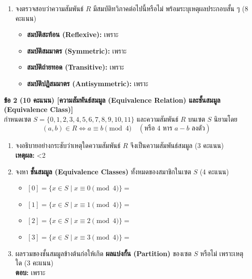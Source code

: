 \documentclass[a4paper,12pt]{article}
\newcounter{examline}
\newcommand{\examlines}[1]{%
  \setcounter{examline}{0}%
  \loop\ifnum\value{examline}<#1\relax
    \par\vspace{0.68em}\noindent\textcolor{gray!40}{\hrulefill}%
    \stepcounter{examline}%
  \repeat
}
\begin{document}
\begin{enumerate}[label=1.\arabic*), itemsep=3pt]
  \item จงตรวจสอบว่าความสัมพันธ์ $R$ มีสมบัติทวิภาคต่อไปนี้หรือไม่ พร้อมระบุเหตุผลประกอบสั้น ๆ (8 คะแนน)
  \begin{itemize}[leftmargin=1.0cm, itemsep=2.5pt]
    \item[ก)] \textbf{สมบัติสะท้อน (Reflexive):} \makebox[2.2cm]{\dotfill} เพราะ \makebox[8.2cm]{\dotfill}
    \item[ข)] \textbf{สมบัติสมมาตร (Symmetric):} \makebox[2.2cm]{\dotfill} เพราะ \makebox[8.2cm]{\dotfill}
    \item[ค)] \textbf{สมบัติถ่ายทอด (Transitive):} \makebox[2.2cm]{\dotfill} เพราะ \makebox[8.2cm]{\dotfill}
    \item[ง)] \textbf{สมบัติปฏิสมมาตร (Antisymmetric):} \makebox[1.8cm]{\dotfill} เพราะ \makebox[8.0cm]{\dotfill}
  \end{itemize}
\end{enumerate}
\vspace{0.4em}

\noindent\textbf{ข้อ 2 (10 คะแนน) [ความสัมพันธ์สมมูล (Equivalence Relation) และชั้นสมมูล (Equivalence Class)]} \\
กำหนดเซต $S = \{0, 1, 2, 3, 4, 5, 6, 7, 8, 9, 10, 11\}$ และความสัมพันธ์ $R$ บนเซต $S$ นิยามโดย
\[
(a, b) \in R \iff a \equiv b \pmod{4} \quad (\text{หรือ } 4 \text{ หาร } a - b \text{ ลงตัว})
\]
\begin{enumerate}[label=2.\arabic*), itemsep=3.5pt]
  \item จงอธิบายอย่างกระชับว่าเหตุใดความสัมพันธ์ $R$ จึงเป็นความสัมพันธ์สมมูล (3 คะแนน)\\
  \noindent\textbf{เหตุผล:} \dotfill
  \examlines{2}
  \item จงหา \textbf{ชั้นสมมูล (Equivalence Classes)} ทั้งหมดของสมาชิกในเซต $S$ (4 คะแนน)
  \begin{itemize}[leftmargin=1.2cm, itemsep=2pt]
    \item $[0] = \{ x \in S \mid x \equiv 0 \pmod{4} \} = $ \makebox[9.0cm]{\dotfill}
    \item $[1] = \{ x \in S \mid x \equiv 1 \pmod{4} \} = $ \makebox[9.0cm]{\dotfill}
    \item $[2] = \{ x \in S \mid x \equiv 2 \pmod{4} \} = $ \makebox[9.0cm]{\dotfill}
    \item $[3] = \{ x \in S \mid x \equiv 3 \pmod{4} \} = $ \makebox[9.0cm]{\dotfill}
  \end{itemize}
  \item ผลรวมของชั้นสมมูลข้างต้นก่อให้เกิด \textbf{ผลแบ่งกั้น (Partition)} ของเซต $S$ หรือไม่ เพราะเหตุใด (3 คะแนน)\\
  \noindent\textbf{ตอบ:} \makebox[2.5cm]{\dotfill} เพราะ \makebox[9.5cm]{\dotfill}
\end{enumerate}
\end{document}
